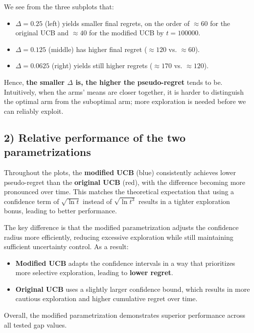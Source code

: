 We see from the three subplots that:
\begin{itemize}
    \item \( \Delta=0.25 \) (left) yields smaller final regrets, on the order of \( \approx 60 \) for the original UCB and \( \approx 40 \) for the modified UCB by \( t=100000 \).
    \item \( \Delta=0.125 \) (middle) has higher final regret (\( \approx 120 \) vs. \( \approx 60 \)).
    \item \( \Delta=0.0625 \) (right) yields still higher regrets (\( \approx 170 \) vs. \( \approx 120 \)).
\end{itemize}

Hence, \textbf{the smaller \( \Delta \) is, the higher the pseudo-regret} tends to be. Intuitively, when the arms’ means are closer together, it is harder to distinguish the optimal arm from the suboptimal arm; more exploration is needed before we can reliably exploit.

\subsection{2) Relative performance of the two parametrizations}

Throughout the plots, the \textbf{modified UCB} (blue) consistently achieves lower pseudo-regret than the \textbf{original UCB} (red), with the difference becoming more pronounced over time. This matches the theoretical expectation that using a confidence term of \( \sqrt{\ln t} \) instead of \( \sqrt{\ln t^3} \) results in a tighter exploration bonus, leading to better performance.

The key difference is that the modified parametrization adjusts the confidence radius more efficiently, reducing excessive exploration while still maintaining sufficient uncertainty control. As a result:

\begin{itemize}
    \item \textbf{Modified UCB} adapts the confidence intervals in a way that prioritizes more selective exploration, leading to \textbf{lower regret}.
    \item \textbf{Original UCB} uses a slightly larger confidence bound, which results in more cautious exploration and higher cumulative regret over time.
\end{itemize}

Overall, the modified parametrization demonstrates superior performance across all tested gap values.

